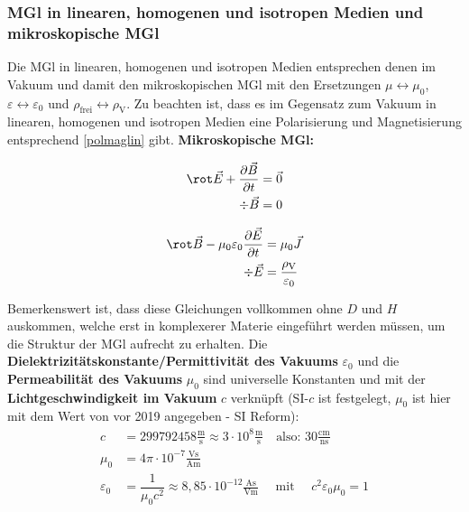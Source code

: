  \subsubsection{MGl in linearen, homogenen und isotropen Medien und mikroskopische MGl}\label{mikrosmax}
 Die MGl in linearen, homogenen und isotropen Medien entsprechen denen im Vakuum und damit den mikroskopischen MGl mit den Ersetzungen $\mu\leftrightarrow\mu_0$, $\varepsilon\leftrightarrow\varepsilon_0$ und $\rho_\text{frei}\leftrightarrow\rho_\text{V}$. Zu beachten ist, dass es im Gegensatz zum Vakuum in linearen, homogenen und isotropen Medien eine Polarisierung und Magnetisierung entsprechend \ref{polmaglin} gibt. \textbf{Mikroskopische MGl:}\\
 \begin{minipage}{0.5\textwidth}
 	\begin{align}
 		\rot\vec{E}+ \frac{\partial \vec{B}}{\partial t} & = \vec{0} \\
 		\div\vec{B}                                      & =0
 	\end{align}
 \end{minipage}
 \begin{minipage}{0.5\textwidth}
 	\begin{align}
 		\rot\vec{B}-\mu_0\varepsilon_0\frac{\partial\vec{E}}{\partial t} & =\mu_0\vec{J}       \\
 		\div\vec{E}                                    & =\frac{\rho_{\text{V}}}{\varepsilon_0}
 	\end{align}
 \end{minipage}
Bemerkenswert ist, dass diese Gleichungen vollkommen ohne $D$ und $H$ auskommen, welche erst in komplexerer Materie eingeführt werden müssen, um die Struktur der MGl aufrecht zu erhalten. Die \textbf{Dielektrizitätskonstante/Permittivität des Vakuums} $\varepsilon_{0}$
 und die \textbf{Permeabilität des Vakuums} $\mu_{0}$ sind universelle Konstanten
 und mit der \textbf{Lichtgeschwindigkeit im Vakuum} $c$ verknüpft (SI-$c$ ist festgelegt, $\mu_0$ ist hier mit dem Wert von vor 2019 angegeben - SI Reform):
 \begin{equation}\label{vaklicht}
 	\begin{split}
 		c&= 299792458\mathrm{\frac{m}{s}}\approx 3\cdot 10^{8}\mathrm{\frac{m}{s}}\quad\text{
 			also: }30\mathrm{\frac{cm}{ns}}\\ \mu_{0}&= 4\pi\cdot 10^{-7}\mathrm{\frac{Vs}{Am}}
 		\\ \varepsilon_{0}&= \dfrac{1}{\mu_0 c^2}\approx 8,85\cdot 10^{-12}\mathrm{\frac{As}{Vm}}
 		\quad\text{ mit }\quad{c^2\varepsilon_0\mu_0 = 1}
 	\end{split}
 \end{equation}
